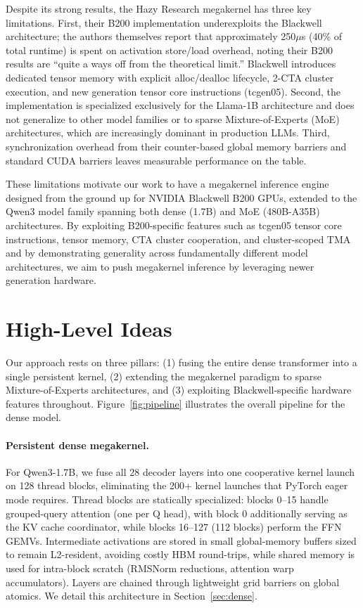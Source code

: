 \documentclass[sigplan,screen]{acmart}
\begin{document}
Despite its strong results, the Hazy Research megakernel has three key limitations. First, their B200 implementation underexploits the Blackwell architecture; the authors themselves report that approximately 250$\mu$s (40\% of total runtime) is spent on activation store/load overhead, noting their B200 results are ``quite a ways off from the theoretical limit.'' Blackwell introduces dedicated tensor memory with explicit alloc/dealloc lifecycle, 2-CTA cluster execution, and new generation tensor core instructions (tcgen05). Second, the implementation is specialized exclusively for the Llama-1B architecture and does not generalize to other model families or to sparse Mixture-of-Experts (MoE) architectures, which are increasingly dominant in production LLMs. Third, synchronization overhead from their counter-based global memory barriers and standard CUDA barriers leaves measurable performance on the table.


These limitations motivate our work to have a megakernel inference engine designed from the ground up for NVIDIA Blackwell B200 GPUs, extended to the Qwen3 model family spanning both dense (1.7B) and MoE (480B-A35B) architectures. By exploiting B200-specific features such as tcgen05 tensor core instructions, tensor memory, CTA cluster cooperation, and cluster-scoped TMA and by demonstrating generality across fundamentally different model architectures, we aim to push megakernel inference by leveraging newer generation hardware.

\section{High-Level Ideas}

Our approach rests on three pillars: (1) fusing the entire dense transformer into a single persistent kernel, (2) extending the megakernel paradigm to sparse Mixture-of-Experts architectures, and (3) exploiting Blackwell-specific hardware features throughout. Figure~\ref{fig:pipeline} illustrates the overall pipeline for the dense model.

\paragraph{Persistent dense megakernel.}
For Qwen3-1.7B, we fuse all 28 decoder layers into one cooperative kernel launch on 128 thread blocks, eliminating the 200+ kernel launches that PyTorch eager mode requires. Thread blocks are statically specialized: blocks 0--15 handle grouped-query attention (one per Q head), with block 0 additionally serving as the KV cache coordinator, while blocks 16--127 (112 blocks) perform the FFN GEMVs. Intermediate activations are stored in small global-memory buffers sized to remain L2-resident, avoiding costly HBM round-trips, while shared memory is used for intra-block scratch (RMSNorm reductions, attention warp accumulators). Layers are chained through lightweight grid barriers on global atomics. We detail this architecture in Section~\ref{sec:dense}.
\end{document}
